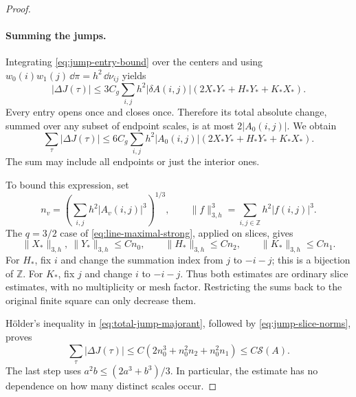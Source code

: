 \begin{proof}
\paragraph{Summing the jumps.}
Integrating \eqref{eq:jump-entry-bound} over the centers and using
$w_0(i)w_1(j)\,\dd\pi=h^2\,\dd\nu_{ij}$ yields
\[
 |\Delta J(\tau)|\le3C_g\sum_{i,j}h^2|\delta A(i,j)|
       (2X_*Y_*+H_*Y_*+K_*X_*).
\]
Every entry opens once and closes once.  Therefore its total absolute
change, summed over any subset of endpoint scales, is at most
$2|A_0(i,j)|$.  We obtain
\begin{equation}\label{eq:total-jump-majorant}
 \sum_\tau|\Delta J(\tau)|
 \le6C_g\sum_{i,j}h^2|A_0(i,j)|
       (2X_*Y_*+H_*Y_*+K_*X_*).
\end{equation}
The sum may include all endpoints or just the interior ones.

To bound this expression, set
\[
 n_v=\left(\sum_{i,j}h^2|A_v(i,j)|^3\right)^{1/3},
 \qquad \|f\|_{3,h}^3=\sum_{i,j\in\mathbb Z}h^2|f(i,j)|^3.
\]
The $q=3/2$ case of \eqref{eq:line-maximal-strong}, applied on slices,
gives
\begin{equation}\label{eq:jump-slice-norms}
 \|X_*\|_{3,h},\ \|Y_*\|_{3,h}\le Cn_0,
 \qquad \|H_*\|_{3,h}\le Cn_2,
 \qquad \|K_*\|_{3,h}\le Cn_1.
\end{equation}
For $H_*$, fix $i$ and change the summation index from $j$ to $-i-j$;
this is a bijection of $\mathbb Z$.  For $K_*$, fix $j$ and change
$i$ to $-i-j$.  Thus both estimates are ordinary slice estimates,
with no multiplicity or mesh factor.  Restricting the sums back to
the original finite square can only decrease them.

H\"older's inequality in \eqref{eq:total-jump-majorant}, followed by
\eqref{eq:jump-slice-norms}, proves
\begin{equation}\label{eq:total-jump-bound}
 \sum_\tau|\Delta J(\tau)|
 \le C(2n_0^3+n_0^2n_2+n_0^2n_1)
 \le C\mathcal S(A).
\end{equation}
The last step uses $a^2b\le(2a^3+b^3)/3$.
In particular, the estimate has no dependence on how many distinct
scales occur.


\end{proof}
